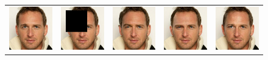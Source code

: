 \begin{figure}[ht]
\begin{center}
\begin{tabular}{ccccc}
        \includegraphics[width=.15\textwidth]{Chapter2/samples/inpainting/table/2/x.png} &   
        \includegraphics[width=.15\textwidth]{Chapter2/samples/inpainting/table/2/y.png} &
        \includegraphics[width=.15\textwidth]{Chapter2/samples/inpainting/table/2/sr3.png} & 
        \includegraphics[width=.15\textwidth]{Chapter2/samples/inpainting/table/2/Song.png} & 
        \includegraphics[width=.15\textwidth]{Chapter2/samples/inpainting/table/2/DV.png} \\
        

\end{tabular}
\end{center}
\end{figure}
